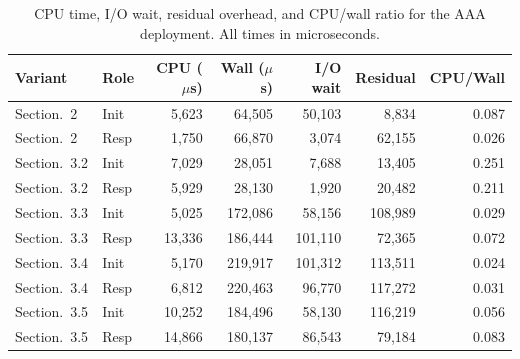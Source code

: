 \documentclass{easychair}
\newcommand{\VarSecShort}[1]{Section.~#1}
\begin{document}
\begin{table}[h]
\centering
\footnotesize
\caption{CPU time, I/O wait, residual overhead, and CPU/wall ratio for
the AAA deployment. All times in microseconds.}
\label{tab:overhead}
\begin{tabular}{llrrrrr}
\toprule
\textbf{Variant} & \textbf{Role} & \textbf{CPU ($\mu$s)} & \textbf{Wall ($\mu$s)} & \textbf{I/O wait} & \textbf{Residual} & \textbf{CPU/Wall} \\
\midrule
\VarSecShort{2}   & Init &  5{,}623 &  64{,}505 &  50{,}103 &   8{,}834 & 0.087 \\
\VarSecShort{2}   & Resp &  1{,}750 &  66{,}870 &   3{,}074 &  62{,}155 & 0.026 \\
\VarSecShort{3.2} & Init &  7{,}029 &  28{,}051 &   7{,}688 &  13{,}405 & 0.251 \\
\VarSecShort{3.2} & Resp &  5{,}929 &  28{,}130 &   1{,}920 &  20{,}482 & 0.211 \\
\VarSecShort{3.3} & Init &  5{,}025 & 172{,}086 &  58{,}156 & 108{,}989 & 0.029 \\
\VarSecShort{3.3} & Resp & 13{,}336 & 186{,}444 & 101{,}110 &  72{,}365 & 0.072 \\
\VarSecShort{3.4} & Init &  5{,}170 & 219{,}917 & 101{,}312 & 113{,}511 & 0.024 \\
\VarSecShort{3.4} & Resp &  6{,}812 & 220{,}463 &  96{,}770 & 117{,}272 & 0.031 \\
\VarSecShort{3.5} & Init & 10{,}252 & 184{,}496 &  58{,}130 & 116{,}219 & 0.056 \\
\VarSecShort{3.5} & Resp & 14{,}866 & 180{,}137 &  86{,}543 &  79{,}184 & 0.083 \\
\bottomrule
\end{tabular}
\end{table}
\end{document}
